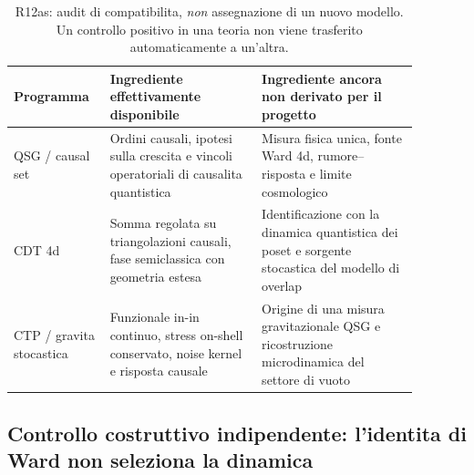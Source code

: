 \documentclass[11pt,a4paper]{article}
\begin{document}
\begin{table}[htbp]
\centering\small
\caption{R12as: audit di compatibilita, \emph{non} assegnazione di un nuovo modello. Un controllo positivo in una teoria non viene trasferito automaticamente a un'altra.}
\begin{tabular}{p{0.19\linewidth}p{0.34\linewidth}p{0.35\linewidth}}
\toprule
Programma & Ingrediente effettivamente disponibile & Ingrediente ancora non derivato per il progetto \\
\midrule
QSG / causal set & Ordini causali, ipotesi sulla crescita e vincoli operatoriali di causalita quantistica & Misura fisica unica, fonte Ward 4d, rumore--risposta e limite cosmologico \\
CDT 4d & Somma regolata su triangolazioni causali, fase semiclassica con geometria estesa & Identificazione con la dinamica quantistica dei poset e sorgente stocastica del modello di overlap \\
CTP / gravita stocastica & Funzionale in-in continuo, stress on-shell conservato, noise kernel e risposta causale & Origine di una misura gravitazionale QSG e ricostruzione microdinamica del settore di vuoto \\
\bottomrule
\end{tabular}
\end{table}

\subsection{Controllo costruttivo indipendente: l'identita di Ward non seleziona la dinamica}
\end{document}
